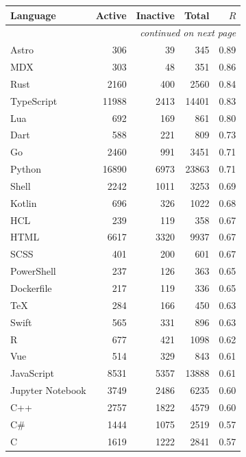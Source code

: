\documentclass[12pt,a4paper]{article}
\begin{document}
\begin{longtable}{lrrrr}
\toprule
Language & Active & Inactive & Total & $R$ \\
\midrule
\endhead
\midrule
\multicolumn{5}{r}{\small\itshape continued on next page}\\
\endfoot
\bottomrule
\endlastfoot
Astro              &    306 &     39 &     345 & 0.89 \\
MDX                &    303 &     48 &     351 & 0.86 \\
Rust               &  2160 &    400 &    2560 & 0.84 \\
TypeScript         & 11988 &   2413 &   14401 & 0.83 \\
Lua                &    692 &    169 &     861 & 0.80 \\
Dart               &    588 &    221 &     809 & 0.73 \\
Go                 &  2460 &    991 &    3451 & 0.71 \\
Python             & 16890 &   6973 &   23863 & 0.71 \\
Shell              &  2242 &   1011 &    3253 & 0.69 \\
Kotlin             &    696 &    326 &    1022 & 0.68 \\
HCL                &    239 &    119 &     358 & 0.67 \\
HTML               &  6617 &   3320 &    9937 & 0.67 \\
SCSS               &    401 &    200 &     601 & 0.67 \\
PowerShell         &    237 &    126 &     363 & 0.65 \\
Dockerfile         &    217 &    119 &     336 & 0.65 \\
TeX                &    284 &    166 &     450 & 0.63 \\
Swift              &    565 &    331 &     896 & 0.63 \\
R                  &    677 &    421 &    1098 & 0.62 \\
Vue                &    514 &    329 &     843 & 0.61 \\
JavaScript         &  8531 &   5357 &   13888 & 0.61 \\
Jupyter Notebook   &  3749 &   2486 &    6235 & 0.60 \\
C++                &  2757 &   1822 &    4579 & 0.60 \\
C\#                &  1444 &   1075 &    2519 & 0.57 \\
C                  &  1619 &   1222 &    2841 & 0.57 \\

\end{longtable}
\end{document}
